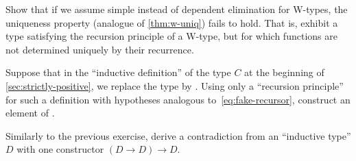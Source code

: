 \begin{ex}
  Show that if we assume simple instead of dependent elimination for W-types, the uniqueness property (analogue of \autoref{thm:w-uniq}) fails to hold.
  That is, exhibit a type satisfying the recursion principle of a W-type, but for which functions are not determined uniquely by their recurrence.
\end{ex}

\begin{ex}\label{ex:loop}
  Suppose that in the ``inductive definition'' of the type $C$ at the beginning of \autoref{sec:strictly-positive}, we replace the type \nat by \emptyt.
  Using only a ``recursion principle'' for such a definition with hypotheses analogous to~\eqref{eq:fake-recursor}, construct an element of \emptyt.
\end{ex}

\begin{ex}\label{ex:loop2}
  Similarly to the previous exercise, derive a contradiction from an ``inductive type'' $D$ with one constructor $(D\to D) \to D$.
\end{ex}


